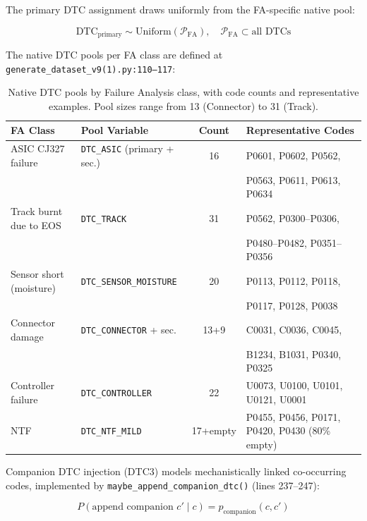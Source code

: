 \documentclass[10pt,a4paper]{article}
\begin{document}
The primary DTC assignment draws uniformly from the FA-specific native pool:

\begin{equation}
\text{DTC}_{\text{primary}} \sim \text{Uniform}(\mathcal{P}_{\text{FA}}), \quad \mathcal{P}_{\text{FA}} \subset \text{all DTCs}
\label{eq:dtc-primary}
\end{equation}

The native DTC pools per FA class are defined at \texttt{generate\_dataset\_v9(1).py:110--117}:

\begin{table}[H]
\centering
\caption{Native DTC pools by Failure Analysis class, with code counts and representative examples. Pool sizes range from 13 (Connector) to 31 (Track).}
\label{tab:dtc-pools}
\small
\begin{tabular}{lR{2.5cm}cR{6.5cm}}
\toprule
\textbf{FA Class} & \textbf{Pool Variable} & \textbf{Count} & \textbf{Representative Codes} \\
\midrule
ASIC CJ327 failure & \texttt{DTC\_ASIC} (primary + sec.) & 16 & P0601, P0602, P0562,\\
& & & P0563, P0611, P0613, P0634 \\
Track burnt due to EOS & \texttt{DTC\_TRACK} & 31 & P0562, P0300--P0306,\\
& & & P0480--P0482, P0351--P0356 \\
Sensor short (moisture) & \texttt{DTC\_SENSOR\_MOISTURE} & 20 & P0113, P0112, P0118,\\
& & & P0117, P0128, P0038 \\
Connector damage & \texttt{DTC\_CONNECTOR} + sec. & 13+9 & C0031, C0036, C0045,\\
& & & B1234, B1031, P0340, P0325 \\
Controller failure & \texttt{DTC\_CONTROLLER} & 22 & U0073, U0100, U0101, U0121, U0001 \\
NTF & \texttt{DTC\_NTF\_MILD} & 17+empty & P0455, P0456, P0171, P0420, P0430 (80\% empty) \\
\bottomrule
\end{tabular}
\end{table}

Companion DTC injection (DTC3) models mechanistically linked co-occurring codes, implemented by \texttt{maybe\_append\_companion\_dtc()} (lines 237--247):

\begin{equation}
P(\text{append companion } c' \mid c) = p_{\text{companion}}(c, c')
\label{eq:companion-dtc}
\end{equation}
\end{document}
